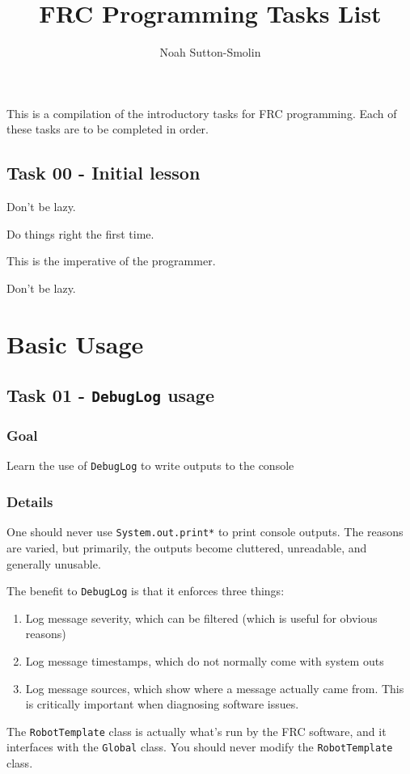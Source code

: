 \documentclass[a4paper]{article}
\title{FRC Programming Tasks List}
\author{Noah Sutton-Smolin}
\begin{document}
\setcounter{tocdepth}{2}\maketitle\tableofcontents\pagebreak

This is a compilation of the introductory tasks for FRC programming. Each of these tasks are to be completed in order.

\subsection{Task 00 - Initial lesson}

Don't be lazy.

Do things right the first time.

This is the imperative of the programmer.

Don't be lazy.
\section{Basic Usage}
\subsection{Task 01 - \lstinline{DebugLog} usage}
\subsubsection{Goal} Learn the use of \lstinline{DebugLog} to write outputs to the console
\subsubsection{Details} One should never use \lstinline{System.out.print*} to print console outputs. The reasons are varied, but primarily, the outputs become cluttered, unreadable, and generally unusable. 

The benefit to \lstinline{DebugLog} is that it enforces three things:
\begin{enumerate}\item{Log message severity, which can be filtered (which is useful for obvious reasons)}\item{Log message timestamps, which do not normally come with system outs}\item{Log message sources, which show where a message actually came from. This is critically important when diagnosing software issues.}\end{enumerate}

The \lstinline{RobotTemplate} class is actually what's run by the FRC software, and it interfaces with the \lstinline{Global} class. You should never modify the \lstinline{RobotTemplate} class.
\end{document}
